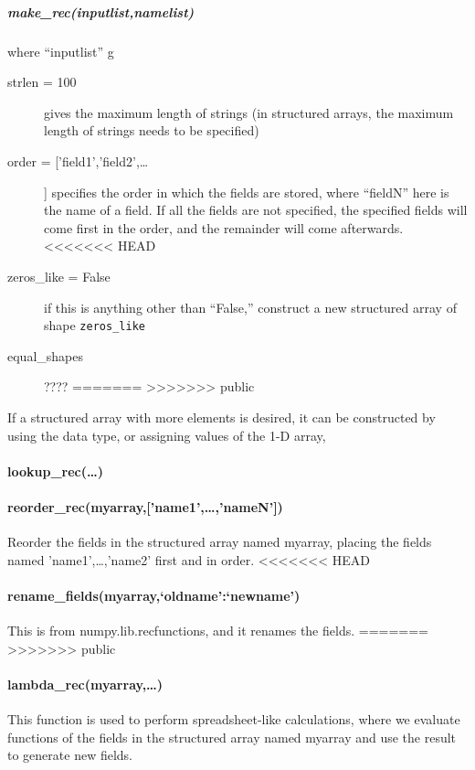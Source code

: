 \subparagraph{make\_rec(inputlist,namelist)}
    where ``inputlist'' g
\begin{mykwargs}
    \begin{description}
        \item[strlen = 100] gives the maximum length of strings
            (in structured arrays, the maximum length of strings needs to be
            specified)
        \item[order = ['field1','field2',\ldots] ]
            specifies the order in which the fields are stored,
            where ``fieldN'' here is the name of a field.
            If all the fields are not specified, the specified fields
            will come first in the order, and the remainder will come afterwards.
<<<<<<< HEAD
        \item[zeros_like = False] if this is anything other than ``False,'' construct a new structured array of shape \texttt{zeros\_like} 
        \item[equal\_shapes] ???? 
=======
>>>>>>> public
    \end{description}
\end{mykwargs}
If a structured array with more elements is desired,
    it can be constructed by using the data type, or assigning values of the 1-D array,
\paragraph{lookup\_rec(\ldots)}
\paragraph{reorder\_rec(myarray,['name1',\ldots,'nameN'])}
Reorder the fields in the structured array named myarray,
    placing the fields named 'name1',\ldots,'name2'
    first and in order.
<<<<<<< HEAD
\paragraph{rename\_fields(myarray,{`oldname':`newname'})}
This is from numpy.lib.recfunctions, and it renames the fields.
=======
>>>>>>> public
\paragraph{lambda\_rec(myarray,\ldots)}\label{codelabel:lambda_rec}
This function is used to perform spreadsheet-like calculations,
    where we evaluate functions of the fields in the structured
    array named myarray and use the result to generate new fields.

